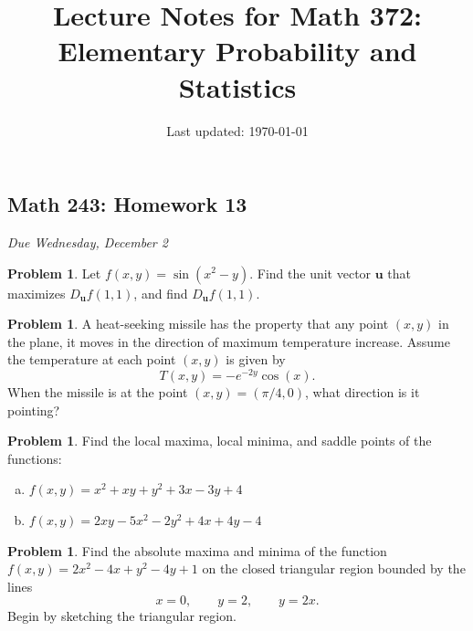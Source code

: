 \documentclass[10pt]{article}
\title{Lecture Notes for Math 372: \\Elementary Probability and Statistics}
\date{Last updated: \today}
\theoremstyle{definition}
\newtheorem{problem}[theorem]{Problem}
\newcommand{\1}[1]{\textbf{1}_{\left[#1\right]}} %
\begin{document}
\begin{center}
  \section*{Math 243: Homework 13}
  \textit{Due Wednesday, December 2}
\end{center}


\begin{problem}
  Let $f(x,y)=\sin(x^2-y)$. Find the unit vector $\boldsymbol{u}$ that maximizes
  $D_{\boldsymbol{u}}f(1,1)$, and find $D_{\boldsymbol{u}}f(1,1)$.
\end{problem}
\vfill
\begin{problem}
  A heat-seeking missile has the property that any point $(x,y)$ in the plane,
  it moves in the direction of maximum temperature increase. Assume the
  temperature at each point $(x,y)$ is given by
  \begin{equation*}
    T(x,y) = -e^{-2y}\cos(x).
  \end{equation*}
  When the missile is at the point $(x,y) = (\pi/4,0)$, what direction is it pointing?
\end{problem}
\vfill
\newpage

\begin{problem}
  Find the local maxima, local minima, and saddle points of the functions:
  \begin{enumerate}[(a)]
    \item $f(x,y) = x^{2}+xy+y^{2}+3x-3y+4 $
    \item $f(x,y) = 2xy - 5x^{2} - 2y^{2} + 4x +4y -4$
  \end{enumerate}
\end{problem}
\newpage


\begin{problem}
  Find the absolute maxima and minima of the function $f(x,y) = 2x^{2}-4x+y^{2}-4y+1$
  on the closed triangular region bounded by the lines
  \begin{equation*}
    x=0, \qquad y = 2, \qquad y=2x.
  \end{equation*}
  Begin by sketching the triangular region.
\end{problem}
\end{document}
